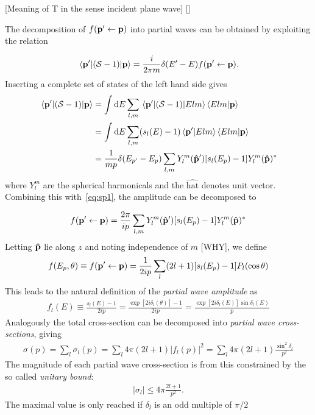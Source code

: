 [Meaning of T in the sense incident plane wave]
[]

The decomposition of \(f(\vb{p}^{\prime}\leftarrow\vb{p})\) into partial waves
can be obtained by exploiting the relation

\begin{equation}
  \label{eq:sp1}
  \mel{\vb{p}^{\prime}}{(\mathcal{S}-1)}{\vb{p}} = \frac{i}{2\pi m}\delta(E^{\prime}-E)f(\vb{p}^{\prime}\leftarrow \vb{p}).
\end{equation}
Inserting a complete set of states of the left hand side gives
\begin{align*}
  \mel{\vb{p}^{\prime}}{(\scat-1)}{\vb{p}} &= \int \dd E \sum_{l, m}  \mel{\vb{p}^{\prime}}{(\scat-1)}{Elm}\ip{Elm}{\vb{p}}\\
                                             &=  \int \dd E \sum_{l, m} (s_{l}(E)-1) \ip{\vb{p}^{\prime}}{Elm}\ip{Elm}{\vb{p}}\\
  &= \frac{1}{mp}\delta(E_{p^{\prime}}-E_{p})\sum_{l,m}Y_{l}^{m}(\vu{p}^{\prime})[s_{l}(E_{p})-1]Y^{m}_{l}(\vu{p})^{*}
\end{align*}
where \(Y_{l}^{m}\) are the spherical harmonicals and the \(\hat{\text{hat}}\) denotes unit vector. Combining this
with~\eqref{eq:sp1}, the amplitude can be decomposed to

\begin{align*}
  f(\vb{p}^{\prime}\leftarrow\vb{p}) = \frac{2\pi}{ip}\sum_{l,m}Y_{l}^{m}(\vu{p}^{\prime})[s_{l}(E_{p})-1]Y^{m}_{l}(\vu{p})^{*}
\end{align*}
Letting \(\vu{p}\) lie along \(z\) and noting independence of \(m\) [WHY], we
define
\begin{align*}
  f(E_{p},\theta) \equiv f(\vb{p}^{\prime}\leftarrow\vb{p})=\frac{1}{2ip}\sum_{l}(2l+1)[s_{l}(E_{p})-1]P_{l}(\cos\theta)
\end{align*}
This leads to the natural definition of the \textit{partial wave amplitude} as
\begin{align*}
  f_{l}(E) \equiv \frac{s_{l}(E)-1}{2ip} = \frac{\exp[ 2i\delta_{l}(\theta)] - 1}{2ip} = \frac{\exp[2i\delta_{l}(E)]\sin\delta_{l}(E)}{p}
\end{align*}
Analogously the total cross-section can be decomposed into \textit{partial wave
  cross-sections}, giving
\begin{align*}
  \sigma(p) = \sum_{l}\sigma_{l}(p) = \sum_{l}4\pi(2l+1)\left| f_{l}(p) \right|^{2} = \sum_{l}4\pi(2l+1)\frac{\sin^{2}\delta_{l}}{p^{2}}
\end{align*}
The magnitude of each partial wave cross-section is from this constrained by the
so called \textit{unitary bound}: 
\begin{align*}
  |\sigma_{l}| \leq 4\pi\frac{2l+1}{p^{2}}.
\end{align*}
The maximal value is only reached if
\(\delta_{l}\) is an odd multiple of \(\pi/2\)

